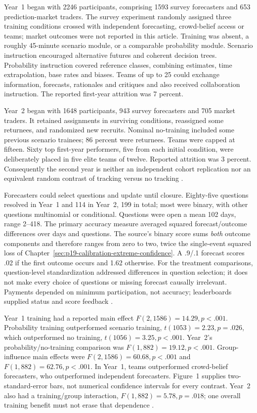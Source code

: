 Year~1 began with 2246 participants, comprising 1593 survey forecasters
and 653 prediction-market traders. The survey experiment randomly
assigned three training conditions crossed with independent forecasting,
crowd-belief access or teams; market outcomes were not reported in this
article. Training was absent, a roughly 45-minute scenario module, or
a comparable probability module. Scenario instruction encouraged
alternative futures and coherent decision trees. Probability instruction
covered reference classes, combining estimates, time extrapolation,
base rates and biases. Teams of up to 25 could exchange information,
forecasts, rationales and critiques and also received collaboration
instruction. The reported first-year attrition was 7 percent.

Year~2 began with 1648 participants, 943 survey forecasters and 705
market traders. It retained assignments in surviving conditions,
reassigned some returnees, and randomized new recruits. Nominal
no-training included some previous scenario trainees; 86 percent were
returnees. Teams were capped at fifteen. Sixty top first-year performers,
five from each initial condition, were deliberately placed in five elite
teams of twelve. Reported attrition was 3 percent. Consequently the
second year is neither an independent cohort replication nor an
equivalent random contrast of tracking versus no tracking
\cite[online p.~3]{MellersEtAl2014ForecastTraining}.

Forecasters could select questions and update until closure. Eighty-five
questions resolved in Year~1 and 114 in Year~2, 199 in total; most
were binary, with other questions multinomial or conditional. Questions
were open a mean 102 days, range 2--418. The primary accuracy measure
averaged squared forecast/outcome differences over days and questions.
The source's binary score sums \emph{both} outcome components and
therefore ranges from zero to two, twice the single-event squared loss
of Chapter~\ref{sec:p19-calibration-extreme-confidence}. A .9/.1
forecast scores .02 if the first outcome occurs and 1.62 otherwise.
For the treatment comparisons, question-level standardization addressed
differences in question selection; it does not make every choice of
questions or missing forecast causally irrelevant. Payments depended
on minimum participation, not accuracy; leaderboards supplied status
and score feedback \cite[online pp.~3--4]{MellersEtAl2014ForecastTraining}.

Year~1 training had a reported main effect
\(F(2,1586)=14.29,p<.001\). Probability training outperformed
scenario training, \(t(1053)=2.23,p=.026\), which outperformed
no training, \(t(1056)=3.25,p<.001\). Year~2's probability/no-training
comparison was \(F(1,882)=19.12,p<.001\). Group-influence main
effects were \(F(2,1586)=60.68,p<.001\) and
\(F(1,882)=62.76,p<.001\). In Year~1, teams outperformed
crowd-belief forecasters, who outperformed independent forecasters.
Figure~1 supplies two-standard-error bars, not numerical confidence
intervals for every contrast. Year~2 also had a training/group interaction,
\(F(1,882)=5.78,p=.018\); one overall training benefit must not
erase that dependence \cite[online pp.~4--5]{MellersEtAl2014ForecastTraining}.

